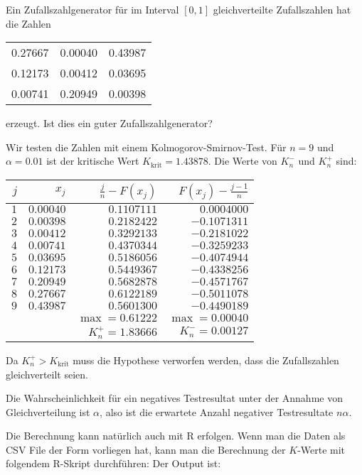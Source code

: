 Ein Zufallszahlgenerator für im Interval $[0,1]$ gleichverteilte
Zufallszahlen hat die Zahlen
\begin{center}
\begin{tabular}{ccc}
0.27667& 0.00040& 0.43987\\
0.12173& 0.00412& 0.03695\\
0.00741& 0.20949& 0.00398
\end{tabular}
\end{center}
erzeugt.
Ist dies ein guter Zufallszahlgenerator?

\begin{loesung}
Wir testen die Zahlen mit einem Kolmogorov-Smirnov-Test.
Für $n=9$ und $\alpha=0.01$ ist der kritische Wert
$K_{\text{krit}}=1.43878$. Die Werte von
$K_n^-$ und $K_n^+$ sind:
\begin{center}
\begin{tabular}{|rrrr|}
\hline
$j$&$x_j$&$\frac{j}n-F(x_j)$&$F(x_j)-\frac{j-1}n$\\
\hline
$1$&$0.00040$&$0.1107111$&$ 0.0004000$\\
$2$&$0.00398$&$0.2182422$&$-0.1071311$\\
$3$&$0.00412$&$0.3292133$&$-0.2181022$\\
$4$&$0.00741$&$0.4370344$&$-0.3259233$\\
$5$&$0.03695$&$0.5186056$&$-0.4074944$\\
$6$&$0.12173$&$0.5449367$&$-0.4338256$\\
$7$&$0.20949$&$0.5682878$&$-0.4571767$\\
$8$&$0.27667$&$0.6122189$&$-0.5011078$\\
$9$&$0.43987$&$0.5601300$&$-0.4490189$\\
\hline
&&$\operatorname{max}=0.61222$&$\operatorname{max}= 0.00040$\\
&&$K_n^+=1.83666$&$K_n^-= 0.00127$\\
\hline
\end{tabular}
\end{center}
Da $K_n^+>K_{\text{krit}}$ muss die Hypothese verworfen werden, dass
die Zufallszahlen gleichverteilt seien.
\item Die Wahrscheinlichkeit für ein negatives Testresultat unter der
Annahme von Gleichverteilung ist $\alpha$, also ist die erwartete Anzahl
negativer Testresultate $n\alpha$.

Die Berechnung kann natürlich auch mit R erfolgen. Wenn man die Daten
als CSV File der Form
vorliegen hat, kann man die Berechnung der $K$-Werte mit folgendem
R-Skript durchführen:
Der Output ist:
\end{loesung}

